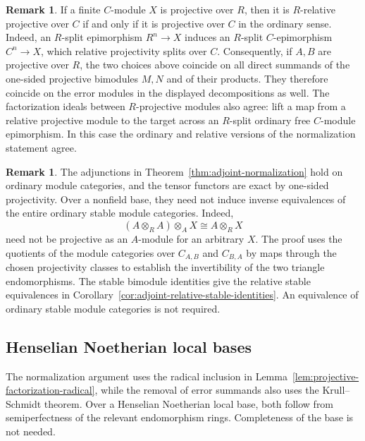 \documentclass[12pt,a4paper,english,reqno]{amsart}
\numberwithin{equation}{section}
\theoremstyle{plain}
\theoremstyle{definition}
\newtheorem{remark}[theorem]{Remark}
\begin{document}
\begin{remark}
\label{rem:ordinary-relative-coincide-base-projective}
If a finite $C$-module $X$ is projective over $R$, then it is
$R$-relative projective over $C$ if and only if it is projective over
$C$ in the ordinary sense.  Indeed, an $R$-split epimorphism $R^n\to X$
induces an $R$-split $C$-epimorphism $C^n\to X$, which relative
projectivity splits over $C$.  Consequently, if $A,B$ are projective
over $R$, the two choices above coincide on all direct summands of
the one-sided projective bimodules $M,N$ and of their products.
They therefore coincide on the error modules in the displayed
decompositions as well.  The factorization ideals between
$R$-projective modules also agree: lift a map from a relative
projective module to the target across an $R$-split ordinary free
$C$-module epimorphism.  In this case the ordinary and relative
versions of the normalization statement agree.
\end{remark}

\begin{remark}
\label{rem:adjunction-versus-ordinary-stable-equivalence}
The adjunctions in Theorem~\ref{thm:adjoint-normalization} hold on
ordinary module categories, and the tensor functors are
exact by one-sided projectivity.  Over a nonfield base, they need not
induce inverse equivalences of the entire ordinary stable module
categories.  Indeed,
\[
 (A\otimes_RA)\otimes_AX\cong A\otimes_RX
\]
need not be projective as an $A$-module for an arbitrary $X$.
The proof uses the quotients of the module categories over
$C_{A,B}$ and $C_{B,A}$ by maps through the chosen projectivity classes
to establish the invertibility of the two triangle endomorphisms.
The stable bimodule identities give the relative stable equivalences
in Corollary~\ref{cor:adjoint-relative-stable-identities}.  An equivalence
of ordinary stable module categories is not required.
\end{remark}

\subsection{Henselian Noetherian local bases}
\label{subsec:adjoint-complete-base}

The normalization argument uses the radical inclusion in
Lemma~\ref{lem:projective-factorization-radical}, while the removal of
error summands also uses the Krull--Schmidt theorem.  Over a Henselian
Noetherian local base, both follow from semiperfectness of the relevant
endomorphism rings.  Completeness of the base is not needed.
\end{document}
